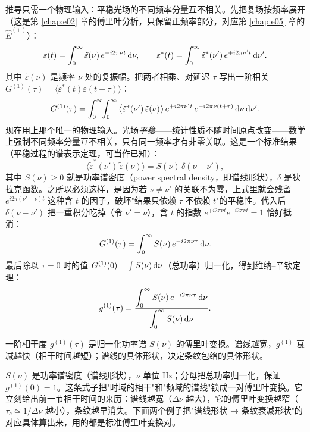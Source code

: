 推导只需一个物理输入：平稳光场的不同频率分量互不相关。先把复场按频率展开（这是第 \ref{chap:e02} 章的傅里叶分析，只保留正频率部分，对应第 \ref{chap:e05} 章的 \(\hat E^{(+)}\)）：
\[
  \varepsilon(t)=\int_0^\infty \tilde\varepsilon(\nu)\,e^{-i2\pi\nu t}\,{\rm d}\nu,
  \qquad
  \varepsilon^\ast(t)=\int_0^\infty \tilde\varepsilon^\ast(\nu')\,e^{+i2\pi\nu' t}\,{\rm d}\nu' .
\]
其中 \(\tilde\varepsilon(\nu)\) 是频率 \(\nu\) 处的复振幅。把两者相乘、对延迟 \(\tau\) 写出一阶相关 \(G^{(1)}(\tau)=\langle\varepsilon^\ast(t)\varepsilon(t+\tau)\rangle\)：
\[
  G^{(1)}(\tau)
  =\int_0^\infty\!\!\int_0^\infty
  \big\langle \tilde\varepsilon^\ast(\nu')\,\tilde\varepsilon(\nu)\big\rangle\,
  e^{+i2\pi\nu' t}\,e^{-i2\pi\nu(t+\tau)}\,{\rm d}\nu\,{\rm d}\nu' .
\]
现在用上那个唯一的物理输入。光场\emph{平稳}——统计性质不随时间原点改变——数学上强制不同频率分量互不相关，只有同一频率才有非零关联。这是一个标准结果（平稳过程的谱表示定理，可当作已知）：
\[
  \big\langle \tilde\varepsilon^\ast(\nu')\,\tilde\varepsilon(\nu)\big\rangle
  =S(\nu)\,\delta(\nu-\nu') ,
\]
其中 \(S(\nu)\ge0\) 就是功率谱密度（power spectral density，即谱线形状），\(\delta\) 是狄拉克函数。之所以必须这样，是因为若 \(\nu\ne\nu'\) 的关联不为零，上式里就会残留 \(e^{i2\pi(\nu'-\nu)t}\) 这种含 \(t\) 的因子，破坏"结果只依赖 \(\tau\) 不依赖 \(t\)"的平稳性。代入后 \(\delta(\nu-\nu')\) 把一重积分吃掉（令 \(\nu'=\nu\)），含 \(t\) 的指数 \(e^{+i2\pi\nu t}e^{-i2\pi\nu t}=1\) 恰好抵消：
\[
  G^{(1)}(\tau)=\int_0^\infty S(\nu)\,e^{-i2\pi\nu\tau}\,{\rm d}\nu .
\]
最后除以 \(\tau=0\) 时的值 \(G^{(1)}(0)=\int S(\nu)\,{\rm d}\nu\)（总功率）归一化，得到维纳--辛钦定理：
\begin{equation}
  g^{(1)}(\tau)=
  \frac{\displaystyle\int_0^\infty S(\nu)\,e^{-i2\pi\nu\tau}\,{\rm d}\nu}
       {\displaystyle\int_0^\infty S(\nu)\,{\rm d}\nu} .
  \label{eq:e09-wiener-khinchin}
\end{equation}
\begin{formulaexplain}
一阶相干度 \(g^{(1)}(\tau)\) 是归一化功率谱 \(S(\nu)\) 的傅里叶变换。谱线越宽，\(g^{(1)}\) 衰减越快（相干时间越短）；谱线的具体形状，决定条纹包络的具体形状。
\end{formulaexplain}
\(S(\nu)\) 是功率谱密度（谱线形状），\(\nu\) 单位 Hz；分母把总功率归一化，保证 \(g^{(1)}(0)=1\)。这条式子把"时域的相干"和"频域的谱线"锁成一对傅里叶变换。它立刻给出前一节相干时间的来历：谱线越宽（\(\Delta\nu\) 越大），它的傅里叶变换越窄（\(\tau_c\simeq1/\Delta\nu\) 越小），条纹越早消失。下面两个例子把"谱线形状 → 条纹衰减形状"的对应具体算出来，用的都是标准傅里叶变换对。

